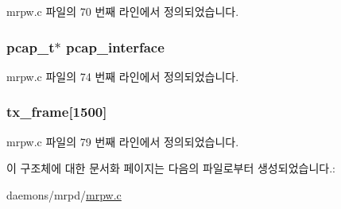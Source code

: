 mrpw.\+c 파일의 70 번째 라인에서 정의되었습니다.

\subsubsection[{\texorpdfstring{pcap\+\_\+interface}{pcap_interface}}]{\setlength{\rightskip}{0pt plus 5cm}pcap\+\_\+t$\ast$ pcap\+\_\+interface}\hypertarget{structnetif_a79b3ba185b2046dc6ed20455903d38a9}{}\label{structnetif_a79b3ba185b2046dc6ed20455903d38a9}


mrpw.\+c 파일의 74 번째 라인에서 정의되었습니다.

\subsubsection[{\texorpdfstring{tx\+\_\+frame}{tx_frame}}]{ tx\+\_\+frame\mbox{[}1500\mbox{]}}\hypertarget{structnetif_a3073db465b138ac609f7c659b9d12c57}{}\label{structnetif_a3073db465b138ac609f7c659b9d12c57}


mrpw.\+c 파일의 79 번째 라인에서 정의되었습니다.



이 구조체에 대한 문서화 페이지는 다음의 파일로부터 생성되었습니다.\+:\begin{DoxyCompactItemize}
\item 
daemons/mrpd/\hyperlink{mrpw_8c}{mrpw.\+c}\end{DoxyCompactItemize}
